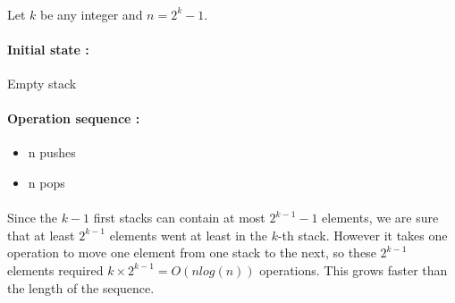 \paragraph{}
Let $k$ be any integer and $n=2^k-1$. 

\paragraph{Initial state : } Empty stack
\paragraph{Operation sequence : }
\begin{itemize}
\item{}n pushes
\item{}n pops
\end{itemize}

\paragraph{}
Since the $k-1$ first stacks can contain at  most $2^{k-1}-1$ elements, we are sure that at least $2^{k-1}$ elements went at least in the $k$-th stack. However it takes one operation to move one element from one stack to the next, so these $2^{k-1}$ elements required $k \times 2^{k-1} = O(nlog(n))$ operations. This grows faster than the length of the sequence.



